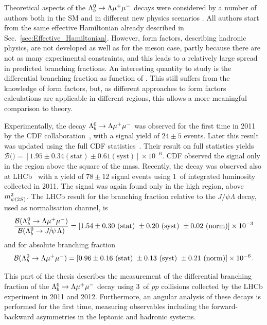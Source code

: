 Theoretical aspects of the ${{\Lambda}^0_{b}}\rightarrow{\ensuremath{\Lambda}}{\ensuremath{\mu^+\mu^-}}$ decays were considered by a number of authors both in the SM and in different new physics scenarios
\cite{Aslam:2008hp,Wang:2008sm,Huang:1998ek,Chen:2001ki,Chen:2001zc,Chen:2001sj,Zolfagharpour:2007eh,Mott:2011cx,Aliev:2010uy,Mohanta:2010eb,Sahoo:2011yb}.
All authors start from the same effective Hamiltonian already described in Sec.~\ref{sec:Effective_Hamiltonian}. 
However, form factors, describing hadronic physics, are not developed as well as for the meson case, partly 
because there are not as many experimental constraints, and this leads to a relatively
large spread in predicted branching fractions. An interesting quantity to study is the differential branching fraction as
function of \qsq. This still suffers from the knowledge of form factors, but, as different approaches to form factors 
calculations are applicable in different \qsq regions, this allows a more meaningful comparison to theory.

Experimentally, the decay ${{\Lambda}^0_{b}}\rightarrow{\ensuremath{\Lambda}}{\ensuremath{\mu^+\mu^-}}$ was observed for the first time in 2011 by the CDF collaboration~\cite{Aaltonen:2011qs}, 
with a signal yield of $24\pm5$ events. Later this result was updated using the full
CDF statistics~\cite{Behari:2013xc}. Their result on full statistics yields
$\mathcal{B}($\Lb\to\Lz\mumu$) =[1.95\pm0.34(\mathrm{stat})\pm0.61(\mathrm{syst})]\times 10^{-6}$. CDF observed the signal
only in the \qsq region above the square of the \psitwos mass.
Recently, the decay was observed also at LHCb~\cite{LHCb-PAPER-2013-025} with a yield of $78\pm12$ signal events
using 1~\invfb of integrated luminosity collected in 2011. The signal was again found only in the high \qsq region, above $m^2_\psitwos$.
The LHCb result for the branching fraction relative to the $J/\psi\Lambda$ decay, used as normalisation channel, is 
%
\begin{equation*}
\frac{\mathcal{B}(\Lb\to\Lz\mumu)}{\mathcal{B}(\Lb\to\jpsi\Lz)}=[1.54 \pm 0.30 ~(\mathrm{stat})~ \pm 0.20 ~(\mathrm{syst})~ \pm 0.02 ~(\mathrm{norm})]\times 10^{-3} 
\end{equation*}
and for absolute branching fraction
\begin{equation*}
\mathcal{B}({{\Lambda}^0_{b}}\rightarrow{\ensuremath{\Lambda}}{\ensuremath{\mu^+\mu^-}}) =[0.96 \pm 0.16 ~(\mathrm{stat})~ \pm 0.13 ~(\mathrm{syst})~ \pm 0.21 ~(\mathrm{norm})]\times 10^{-6}.
\end{equation*}

This part of the thesis describes the measurement of the differential branching fraction
of the ${{\Lambda}^0_{b}}\rightarrow{\ensuremath{\Lambda}}{\ensuremath{\mu^+\mu^-}}$ decay using 3~\invfb of $pp$ collisions collected by the LHCb experiment in 2011 and 2012.
Furthermore, an angular analysis of these decays is performed for the first time, measuring observables including
the forward-backward asymmetries in the leptonic and hadronic systems.

